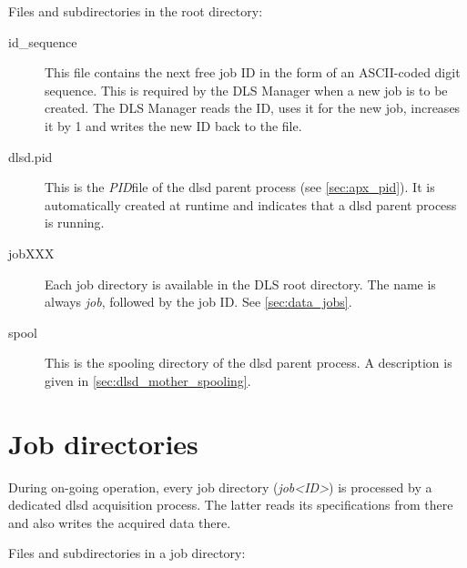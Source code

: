 \documentclass[a4paper,12pt,BCOR6mm,bibtotoc,idxtotoc]{scrbook}
\begin{document}
Files and subdirectories in the root directory:

\begin{description}

\item[id\_sequence] This file contains the next free job ID in the form of an
ASCII-coded digit sequence. This is required by the DLS Manager when a new job
is to be created. The DLS Manager reads the ID, uses it for the new job,
increases it by 1 and writes the new ID back to the file.

\item[dlsd.pid] This is the \textit{PID}file of the dlsd
parent process (see \autoref{sec:apx_pid}). It is automatically created at
runtime and indicates that a dlsd parent process is running.

\item[jobXXX] Each job directory is available in the DLS root directory. The
name is always \textit{job}, followed by the job ID. See
\autoref{sec:data_jobs}.

\item[spool] This is the spooling directory of the dlsd parent process. A
description is given in \autoref{sec:dlsd_mother_spooling}.

\end{description}



\section{Job directories}
\label{sec:data_jobs}

During on-going operation, every job directory (\textit{job\textless ID\textgreater}) is processed by a dedicated dlsd acquisition process. The latter reads its specifications from there and also writes the acquired data there.

Files and subdirectories in a job directory:
\end{document}
